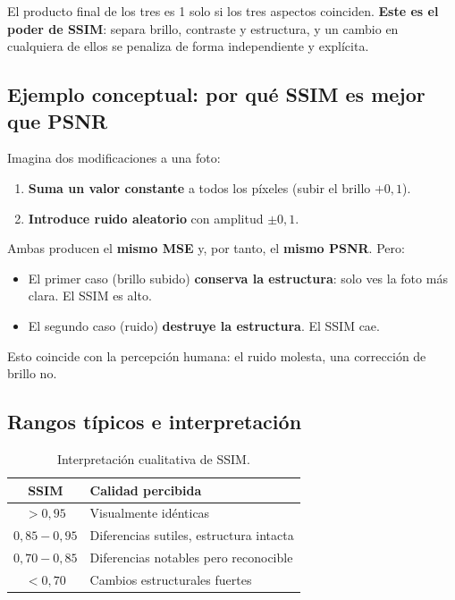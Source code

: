 \documentclass[11pt,a4paper]{article}
\begin{document}
El producto final de los tres es 1 solo si los tres aspectos coinciden.
\textbf{Este es el poder de SSIM}: separa brillo, contraste y estructura, y un
cambio en cualquiera de ellos se penaliza de forma independiente y explícita.

\subsection{Ejemplo conceptual: por qué SSIM es mejor que PSNR}

Imagina dos modificaciones a una foto:

\begin{enumerate}
    \item \textbf{Suma un valor constante} a todos los píxeles (subir el brillo
          \(+0{,}1\)).
    \item \textbf{Introduce ruido aleatorio} con amplitud \(\pm 0{,}1\).
\end{enumerate}

Ambas producen el \textbf{mismo MSE} y, por tanto, el \textbf{mismo PSNR}. Pero:

\begin{itemize}
    \item El primer caso (brillo subido) \textbf{conserva la estructura}: solo
          ves la foto más clara. El SSIM es alto.
    \item El segundo caso (ruido) \textbf{destruye la estructura}. El SSIM cae.
\end{itemize}

Esto coincide con la percepción humana: el ruido molesta, una corrección de
brillo no.

\subsection{Rangos típicos e interpretación}

\begin{table}[H]
\centering
\caption{Interpretación cualitativa de SSIM.}
\begin{tabular}{@{}cl@{}}
\toprule
SSIM & Calidad percibida \\
\midrule
\(> 0{,}95\)        & Visualmente idénticas \\
\(0{,}85 - 0{,}95\) & Diferencias sutiles, estructura intacta \\
\(0{,}70 - 0{,}85\) & Diferencias notables pero reconocible \\
\(< 0{,}70\)        & Cambios estructurales fuertes \\
\bottomrule
\end{tabular}
\end{table}
\end{document}
